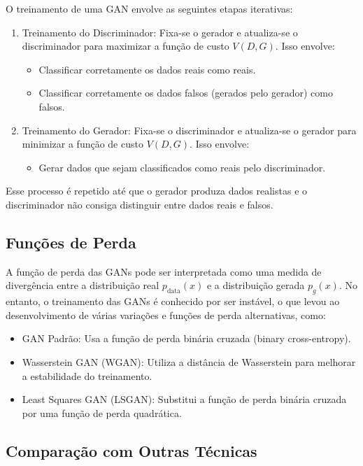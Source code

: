 \documentclass{tufte-handout}
\begin{document}
O treinamento de uma GAN envolve as seguintes etapas iterativas:
\begin{enumerate}
    \item Treinamento do Discriminador: Fixa-se o gerador e atualiza-se o discriminador para maximizar a função de custo $V(D, G)$. Isso envolve:
    \begin{itemize}
        \item Classificar corretamente os dados reais como reais.
        \item Classificar corretamente os dados falsos (gerados pelo gerador) como falsos.
    \end{itemize}
    \item Treinamento do Gerador: Fixa-se o discriminador e atualiza-se o gerador para minimizar a função de custo $V(D, G)$. Isso envolve:
    \begin{itemize}
        \item Gerar dados que sejam classificados como reais pelo discriminador.

    \end{itemize}
\end{enumerate}
Esse processo é repetido até que o gerador produza dados realistas e o discriminador não consiga distinguir entre dados reais e falsos.

\subsection{Funções de Perda}

A função de perda das GANs pode ser interpretada como uma medida de divergência entre a distribuição real $p_{\text{data}}(x)$ e a distribuição gerada $p_g(x)$. No entanto, o treinamento das GANs é conhecido por ser instável, o que levou ao desenvolvimento de várias variações e funções de perda alternativas, como:
\begin{itemize}
    \item GAN Padrão: Usa a função de perda binária cruzada (binary cross-entropy).
    \item Wasserstein GAN (WGAN): Utiliza a distância de Wasserstein para melhorar a estabilidade do treinamento.
    \item Least Squares GAN (LSGAN): Substitui a função de perda binária cruzada por uma função de perda quadrática.    
\end{itemize}

\subsection{Comparação com Outras Técnicas}
\end{document}

